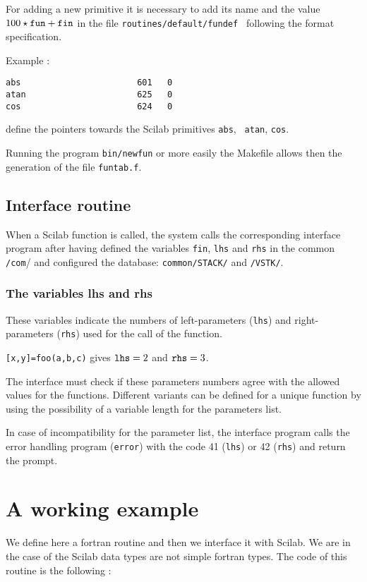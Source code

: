 For adding a new primitive it is necessary to add its name and the 
value $100\star \tt fun+fin$ in the file
\verb!routines/default/fundef ! following the format specification.

Example :
\begin{verbatim}
abs                       601   0
atan                      625   0
cos                       624   0
\end{verbatim}

define the pointers towards the Scilab primitives {\tt abs}, {\tt
atan}, {\tt cos}.  

Running the program {\tt bin/newfun} or more easily the Makefile 
allows then the generation of the file {\tt funtab.f}.


\subsection{Interface routine}

When a Scilab function is called, the system calls the corresponding
interface program after having defined the 
variables \verb!fin!,  \verb!lhs! and \verb!rhs! in the common \verb!/com!/
and  configured  the database:  \verb!common/STACK/!   and
\verb!/VSTK/!.

\subsubsection{The variables lhs and rhs}

These variables indicate the numbers  of left-parameters (\verb!lhs!)
and right-parameters (\verb!rhs!) used for the call of the function.

   \verb![x,y]=foo(a,b,c)!  gives  ${\tt
lhs}=2$ and ${\tt rhs}=3$.

The interface must check if these parameters numbers agree with the
allowed values for the functions. Different variants can be defined for 
a unique function by using the possibility of a variable length for
the parameters list.

In case of incompatibility for the parameter list, the interface program
calls the error handling program (\verb!error!) with the code  41   
(\verb!lhs!) or 42 (\verb!rhs!) and return the prompt.

\section{A working example}
We define here a fortran routine and then we interface it with Scilab.
We are in the case of the Scilab data types are not simple fortran types.
The code of this routine is the following :

